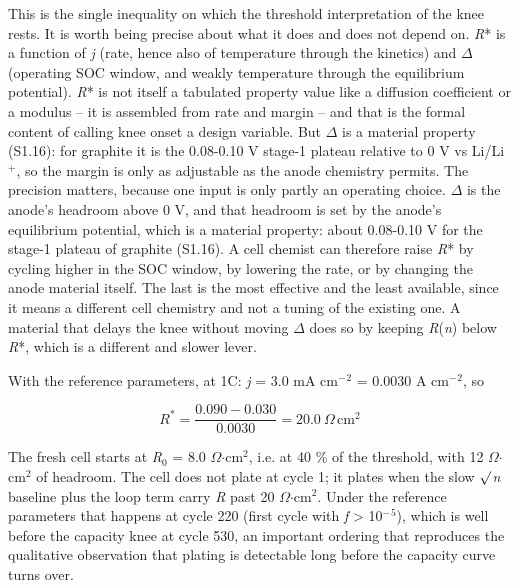 \documentclass[11pt,a4paper]{article}
\begin{document}
This is the single inequality on which the threshold interpretation of the knee rests. It is worth being precise about what it does and does not depend on. \emph{R}* is a function of \emph{j} (rate, hence also of temperature through the kinetics) and \ensuremath{\Delta} (operating SOC window, and weakly temperature through the equilibrium potential). \emph{R}* is not itself a tabulated property value like a diffusion coefficient or a modulus -- it is assembled from rate and margin -- and that is the formal content of calling knee onset a design variable. But \ensuremath{\Delta} is a material property (S1.16): for graphite it is the 0.08-0.10 V stage-1 plateau relative to 0 V vs Li/Li\ensuremath{^{+}}, so the margin is only as adjustable as the anode chemistry permits. The precision matters, because one input is only partly an operating choice. \ensuremath{\Delta} is the anode's headroom above 0 V, and that headroom is set by the anode's equilibrium potential, which is a material property: about 0.08-0.10 V for the stage-1 plateau of graphite (S1.16). A cell chemist can therefore raise \emph{R}* by cycling higher in the SOC window, by lowering the rate, or by changing the anode material itself. The last is the most effective and the least available, since it means a different cell chemistry and not a tuning of the existing one. A material that delays the knee without moving \ensuremath{\Delta} does so by keeping \emph{R}(\emph{n}) below \emph{R}*, which is a different and slower lever.


With the reference parameters, at 1C: \emph{j} = 3.0 mA cm\ensuremath{^{-}}\ensuremath{^{2}} = 0.0030 A cm\ensuremath{^{-}}\ensuremath{^{2}}, so


\begin{equation}R^{*} = \frac{0.090 - 0.030}{0.0030} = 20.0\ \Omega\,\text{cm}^{2} \nonumber\end{equation}


The fresh cell starts at \emph{R}\ensuremath{_{0}} = 8.0 \ensuremath{\Omega}\ensuremath{\cdot}cm\ensuremath{^{2}}, i.e. at 40 \% of the threshold, with 12 \ensuremath{\Omega}\ensuremath{\cdot}cm\ensuremath{^{2}} of headroom. The cell does not plate at cycle 1; it plates when the slow \ensuremath{\surd}\emph{n} baseline plus the loop term carry \emph{R} past 20 \ensuremath{\Omega}\ensuremath{\cdot}cm\ensuremath{^{2}}. Under the reference parameters that happens at cycle 220 (first cycle with \emph{f} > 10\ensuremath{^{-}}\ensuremath{^{5}}), which is well before the capacity knee at cycle 530, an important ordering that reproduces the qualitative observation that plating is detectable long before the capacity curve turns over.
\end{document}
